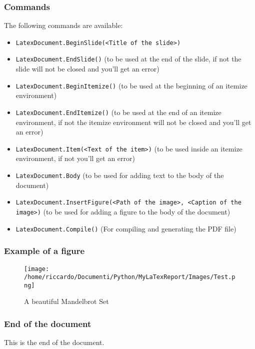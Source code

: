 \documentclass[8pt]{beamer}
\begin{document}
        \begin{frame}
            \frametitle{Commands}
        
The following commands are available:

        \begin{itemize}
        
        \item \texttt{LatexDocument.BeginSlide(<Title of the slide>)}
        
        \item \texttt{LatexDocument.EndSlide()} (to be used at the end of the slide, if not the slide will not be closed and you'll get an error)
        
        \item \texttt{LatexDocument.BeginItemize()} (to be used at the beginning of an itemize environment)
        
        \item \texttt{LatexDocument.EndItemize()} (to be used at the end of an itemize environment, if not the itemize environment will not be closed and you'll get an error)
        
        \item \texttt{LatexDocument.Item(<Text of the item>)} (to be used inside an itemize environment, if not you'll get an error)
        
        \item \texttt{LatexDocument.Body} (to be used for adding text to the body of the document)
        
        \item \texttt{LatexDocument.InsertFigure(<Path of the image>, <Caption of the image>)} (to be used for adding a figure to the body of the document)
        
        \item \texttt{LatexDocument.Compile()} (For compiling and generating the PDF file)
        
        \end{itemize}
        
        \end{frame}
        
        \begin{frame}
            \frametitle{Example of a figure}
        
        \begin{figure}[h]
            \centering
            \texttt{[image: /home/riccardo/Documenti/Python/MyLaTexReport/Images/Test.png]}
            \caption{A beautiful Mandelbrot Set}
        \end{figure}
        
        \end{frame}
        
        \begin{frame}
            \frametitle{End of the document}
        
This is the end of the document.

        \end{frame}
        
        
\end{document}

